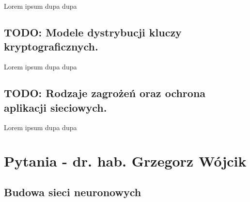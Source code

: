 \documentclass[a4paper,12pt,oneside]{book}
\begin{document}
		Lorem ipsum dupa dupa
		
		\setcounter{section}{63}
		\section{\color{red} TODO: Modele dystrybucji kluczy kryptograficznych.}
		
		Lorem ipsum dupa dupa
		
		\setcounter{section}{64}
		\section{\color{red} TODO: Rodzaje zagrożeń oraz ochrona aplikacji sieciowych.}
		
		Lorem ipsum dupa dupa
		
		
	
	\chapter{Pytania - dr. hab. Grzegorz Wójcik}
		
		\setcounter{section}{32}
		\section{Budowa sieci neuronowych}
				
\end{document}
